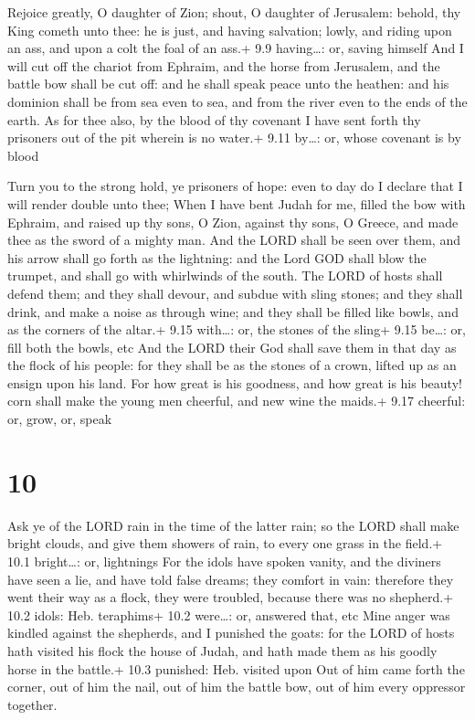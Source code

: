  Rejoice greatly, O daughter of Zion; shout, O daughter of
Jerusalem: behold, thy King cometh unto thee: he is just, and having
salvation; lowly, and riding upon an ass, and upon a colt the foal of an
ass.+ 9.9 having\ldots: or, saving himself  And I will cut
off the chariot from Ephraim, and the horse from Jerusalem, and the
battle bow shall be cut off: and he shall speak peace unto the heathen:
and his dominion shall be from sea even to sea, and from the river even
to the ends of the earth.  As for thee also, by the blood
of thy covenant I have sent forth thy prisoners out of the pit wherein
is no water.+ 9.11 by\ldots: or, whose covenant is by blood

 Turn you to the strong hold, ye prisoners of hope: even
to day do I declare that I will render double unto thee; 
When I have bent Judah for me, filled the bow with Ephraim, and raised
up thy sons, O Zion, against thy sons, O Greece, and made thee as the
sword of a mighty man.  And the LORD shall be seen over
them, and his arrow shall go forth as the lightning: and the Lord GOD
shall blow the trumpet, and shall go with whirlwinds of the south.
 The LORD of hosts shall defend them; and they shall
devour, and subdue with sling stones; and they shall drink, and make a
noise as through wine; and they shall be filled like bowls, and as the
corners of the altar.+ 9.15 with\ldots: or, the stones of the sling+
9.15 be\ldots: or, fill both the bowls, etc  And the LORD
their God shall save them in that day as the flock of his people: for
they shall be as the stones of a crown, lifted up as an ensign upon his
land.  For how great is his goodness, and how great is his
beauty! corn shall make the young men cheerful, and new wine the maids.+
9.17 cheerful: or, grow, or, speak

\hypertarget{section-9}{%
\section{10}\label{section-9}}

 Ask ye of the LORD rain in the time of the latter rain; so
the LORD shall make bright clouds, and give them showers of rain, to
every one grass in the field.+ 10.1 bright\ldots: or, lightnings
 For the idols have spoken vanity, and the diviners have
seen a lie, and have told false dreams; they comfort in vain: therefore
they went their way as a flock, they were troubled, because there was no
shepherd.+ 10.2 idols: Heb. teraphims+ 10.2 were\ldots: or, answered
that, etc  Mine anger was kindled against the shepherds, and
I punished the goats: for the LORD of hosts hath visited his flock the
house of Judah, and hath made them as his goodly horse in the battle.+
10.3 punished: Heb. visited upon  Out of him came forth the
corner, out of him the nail, out of him the battle bow, out of him every
oppressor together.

